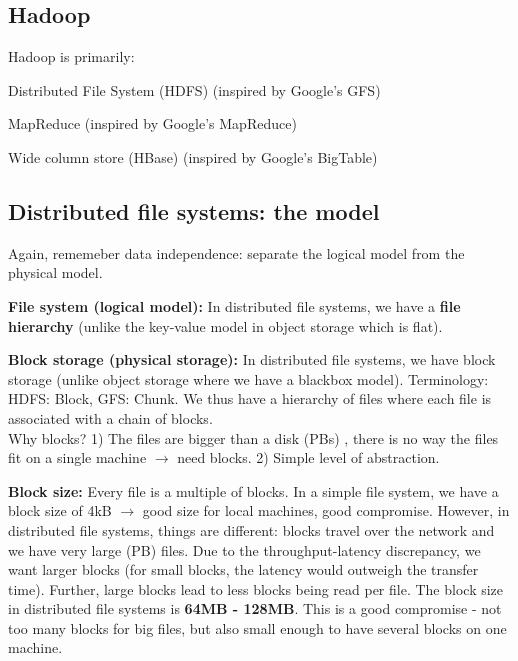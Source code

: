 \documentclass[11pt,oneside,a4paper]{article}
\begin{document}
\subsection{Hadoop}

Hadoop is primarily:

\begin{compactitem}
	\item Distributed File System (HDFS) (inspired by Google's GFS)
	\item MapReduce (inspired by Google's MapReduce)
	\item Wide column store (HBase) (inspired by Google's BigTable)
\end{compactitem}

\subsection{Distributed file systems: the model}

Again, rememeber data independence: separate the logical model from the physical model.

\textbf{File system (logical model):} In distributed file systems, we have a \textbf{file hierarchy} (unlike the key-value model in object storage which is flat).

\textbf{Block storage (physical storage):} In distributed file systems, we have block storage (unlike object storage where we have a blackbox model). Terminology: HDFS: Block, GFS: Chunk.
We thus have a hierarchy of files where each file is associated with a chain of blocks.\\

Why blocks? 1) The files are bigger than a disk (PBs) , there is no way the files fit on a single machine $\rightarrow$ need blocks. 2) Simple level of abstraction.

\textbf{Block size:} Every file is a multiple of blocks. In a simple file system, we have a block size of 4kB $\rightarrow$ good size for local machines, good compromise. However, in distributed file systems, things are different: blocks travel over the network and we have very large (PB) files. Due to the throughput-latency discrepancy, we want larger blocks (for small blocks, the latency would outweigh the transfer time). Further, large blocks lead to less blocks being read per file. The block size in distributed file systems is \textbf{64MB - 128MB}. This is a good compromise - not too many blocks for big files, but also small enough to have several blocks on one machine.\\
\end{document}
